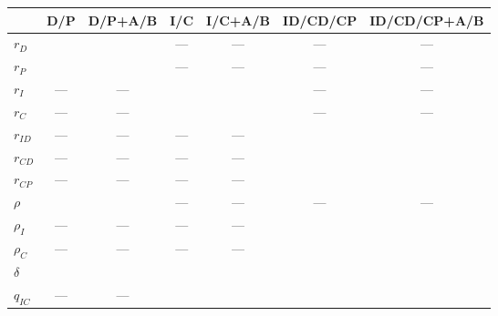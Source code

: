 \begin{supptable}
    \begin{center}
    \begin{tabular}{lcccccc}
                       & D/P & D/P+A/B & I/C & I/C+A/B & ID/CD/CP & ID/CD/CP+A/B \\ \midrule
        $r_D$          &     &         & --- & ---     & ---      & ---          \\
        $r_P$          &     &         & --- & ---     & ---      & ---          \\
        $r_I$          & --- & ---     &     &         & ---      & ---          \\
        $r_C$          & --- & ---     &     &         & ---      & ---          \\
        $r_{ID}$       & --- & ---     & --- & ---     &          &              \\
        $r_{CD}$       & --- & ---     & --- & ---     &          &              \\
        $r_{CP}$       & --- & ---     & --- & ---     &          &              \\
        $\rho$         &     &         & --- & ---     & ---      & ---          \\
        $\rho_I$       & --- & ---     & --- & ---     &          &              \\
        $\rho_C$       & --- & ---     & --- & ---     &          &              \\
        $\delta$       &     &         &     &         &          &              \\
        $q_{IC}$       & --- & ---     &     &         &          &              
    \end{tabular}


\end{center}
\end{supptable}
